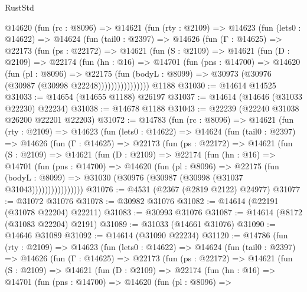 \begin{lexlean}{RustStd}
\begin{coremodule}
    @14620
      (fun (rc : @8096) =>
      @14621
        (fun (rty : @2109) =>
        @14623
          (fun (lets0 : @14622) =>
          @14624
            (fun (tail0 : @2397) =>
            @14626
              (fun (Γ : @14625) =>
              @22173
                (fun (ps : @22172) =>
                @14621
                  (fun (S : @2109) =>
                  @14621
                    (fun (D : @2109) =>
                    @22174
                      (fun (hn : @16) =>
                      @14701
                        (fun (pns : @14700) =>
                        @14620
                          (fun (pl : @8096) =>
                          @22175
                            (fun (bodyL : @8099) =>
                            @30973 (@30976 (@30987 (@30998 @22248))))))))))))))))
    @1188
@31030 := @14614 @14525
@31033 := @14654 (@14655 @1188) @26197
@31037 := @14614 (@14646 (@31033 @22230) @22234)
@31038 := @14678 @1188
@31043 := @22239 (@22240 @31038 @26200 @22201 @22203)
@31072 := @14783
    (fun (rc : @8096) =>
    @14621
      (fun (rty : @2109) =>
      @14623
        (fun (lets0 : @14622) =>
        @14624
          (fun (tail0 : @2397) =>
          @14626
            (fun (Γ : @14625) =>
            @22173
              (fun (ps : @22172) =>
              @14621
                (fun (S : @2109) =>
                @14621
                  (fun (D : @2109) =>
                  @22174
                    (fun (hn : @16) =>
                    @14701
                      (fun (pns : @14700) =>
                      @14620
                        (fun (pl : @8096) =>
                        @22175
                          (fun (bodyL : @8099) =>
                          @31030 (@30976 (@30987 (@30998 (@31037 @31043))))))))))))))))
@31076 := @4531 (@2367 (@2819 @2122) @24977)
@31077 := @31072 @31076
@31078 := @30982 @31076
@31082 := @14614 (@22191 (@31078 @22204) @22211)
@31083 := @30993 @31076
@31087 := @14614 (@8172 (@31083 @22204) @2191)
@31089 := @31033 (@14661 @31076)
@31090 := @14646 @31089
@31092 := @14614 (@31090 @22234)
@31120 := @14786
    (fun (rty : @2109) =>
    @14623
      (fun (lets0 : @14622) =>
      @14624
        (fun (tail0 : @2397) =>
        @14626
          (fun (Γ : @14625) =>
          @22173
            (fun (ps : @22172) =>
            @14621
              (fun (S : @2109) =>
              @14621
                (fun (D : @2109) =>
                @22174
                  (fun (hn : @16) =>
                  @14701
                    (fun (pns : @14700) =>
                    @14620
                      (fun (pl : @8096) =>

\end{coremodule}
\end{lexlean}
